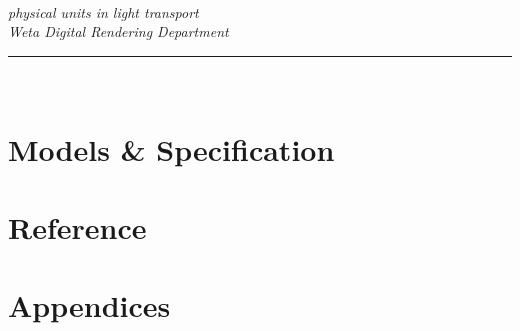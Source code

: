 \begin{titlepage}
\begin{center}

{\fontsize{60}{72}\selectfont \physLight}\\[.3cm]

\textsf{\textit{\fontsize{24}{26.8}\selectfont physical units in light transport}}\\[1.5cm]

\vfill
\large
\textit{Weta Digital Rendering Department}\\[1mm]

%

\hrule \vspace{1mm}
\textsc{\large \physLightVersion}\\[0.5cm]

\end{center}
\end{titlepage}

\tableofcontents
\listoffigures
\listoftables


\part{Models \& Specification}\label{part:models}






\part{Reference}\label{part:ref}




\part{Appendices}\label{part:app}
\appendix








\PrintGlossaries




